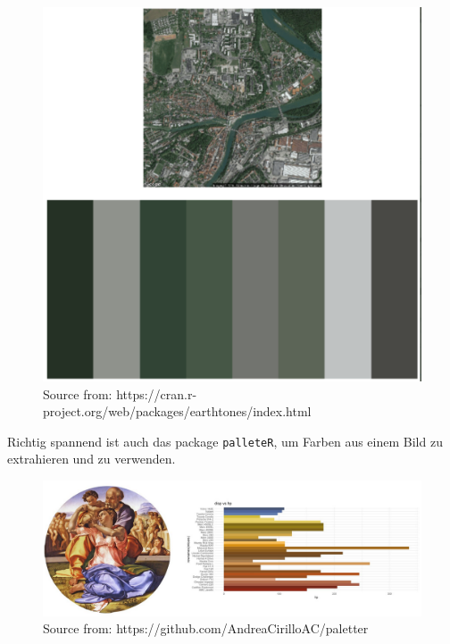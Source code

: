 \documentclass[
]{article}
\begin{document}
\begin{figure}

{\centering \includegraphics[width=1\linewidth]{images/062} 

}

\caption{Source from: https://cran.r-project.org/web/packages/earthtones/index.html}\label{fig:unnamed-chunk-241}
\end{figure}

Richtig spannend ist auch das package \texttt{palleteR}, um Farben aus einem Bild zu extrahieren und zu verwenden.

\begin{figure}

{\centering \includegraphics[width=1\linewidth]{images/063} 

}

\caption{Source from: https://github.com/AndreaCirilloAC/paletter}\label{fig:unnamed-chunk-242}
\end{figure}
\end{document}
